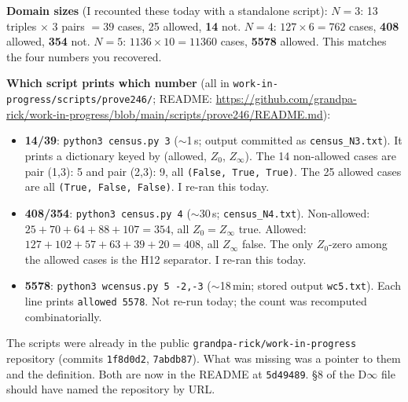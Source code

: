 \documentclass[10pt]{article}
\begin{document}
\textbf{Domain sizes} (I recounted these today with a standalone script): $N=3$: 13 triples $\times$ 3 pairs $=39$ cases, 25 allowed, \textbf{14} not. $N=4$: $127\times 6=762$ cases, \textbf{408} allowed, \textbf{354} not. $N=5$: $1136\times 10=11360$ cases, \textbf{5578} allowed. This matches the four numbers you recovered.

\textbf{Which script prints which number} (all in \texttt{work-in-progress/scripts/prove246/}; README:
\url{https://github.com/grandpa-rick/work-in-progress/blob/main/scripts/prove246/README.md}):
\begin{itemize}
\item \textbf{14/39}: \texttt{python3 census.py 3} ($\sim$1\,s; output committed as \texttt{census\_N3.txt}). It prints a dictionary keyed by (allowed, $Z_0$, $Z_\infty$). The 14 non-allowed cases are pair (1,3): 5 and pair (2,3): 9, all \texttt{(False, True, True)}. The 25 allowed cases are all \texttt{(True, False, False)}. I re-ran this today.
\item \textbf{408/354}: \texttt{python3 census.py 4} ($\sim$30\,s; \texttt{census\_N4.txt}). Non-allowed: $25+70+64+88+107=354$, all $Z_0=Z_\infty$ true. Allowed: $127+102+57+63+39+20=408$, all $Z_\infty$ false. The only $Z_0$-zero among the allowed cases is the H12 separator. I re-ran this today.
\item \textbf{5578}: \texttt{python3 wcensus.py 5 -2,-3} ($\sim$18\,min; stored output \texttt{wc5.txt}). Each line prints \texttt{allowed 5578}. Not re-run today; the count was recomputed combinatorially.
\end{itemize}
The scripts were already in the public \texttt{grandpa-rick/work-in-progress} repository (commits \texttt{1f8d0d2}, \texttt{7abdb87}). What was missing was a pointer to them and the definition. Both are now in the README at \texttt{5d49489}. \S8 of the D$\infty$ file should have named the repository by URL.
\end{document}
